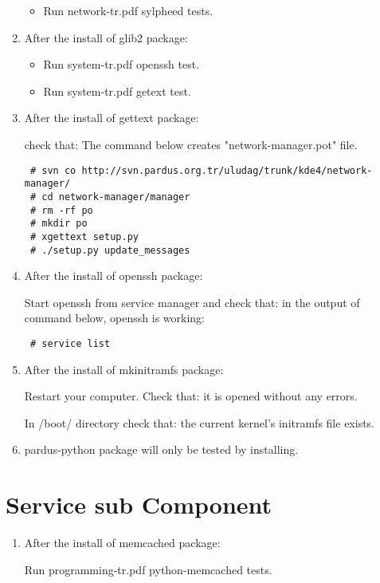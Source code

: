\documentclass[a4paper,10pt]{article}
\begin{document}
\begin{enumerate}
\begin{itemize}
\item Run network-tr.pdf sylpheed tests.
\end{itemize}

\item After the install of glib2 package:
\begin{itemize}
 \item Run system-tr.pdf openssh test.
\item Run system-tr.pdf getext test.
\end{itemize}

\item After the install of gettext package:

check that: The command below creates "network-manager.pot" file.
\begin{verbatim}
 # svn co http://svn.pardus.org.tr/uludag/trunk/kde4/network-manager/
 # cd network-manager/manager
 # rm -rf po
 # mkdir po
 # xgettext setup.py 
 # ./setup.py update_messages
\end{verbatim}


\item After the install of openssh package:

Start openssh from service manager and check that: in the output of command below, openssh is working:
\begin{verbatim}
 # service list 
\end{verbatim}

\item After the install of mkinitramfs package:

Restart your computer. Check that: it is opened without any errors.

In /boot/ directory check that: the current kernel's initramfs file exists.

\item pardus-python package will only be tested by installing.

\end{enumerate}
\section{Service sub Component}
\begin{enumerate}
 \item After the install of memcached package:

  Run programming-tr.pdf python-memcached tests. 
\end{enumerate}
\end{document}
